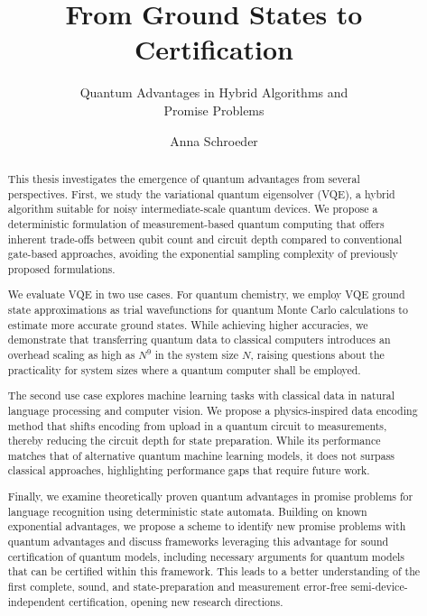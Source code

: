 \documentclass[
	english,%
	accentcolor=9c,%
	ruledheaders=chapter,%
	class=book,%
	thesis={%
		type=drfinal,
		dr=rernat
	},
	fontsize=11pt,%
	parskip=half-,%
	custommargins=true,%
	marginpar=false,%
]{tudapub}
\title{From Ground States to Certification}
\subtitle{ Quantum Advantages in Hybrid Algorithms and \\ Promise Problems}
\author{Anna Schroeder}
\begin{document}
\frontmatter
\maketitle



\affidavit%
\begin{abstract}
This thesis investigates the emergence of quantum advantages from several perspectives. First, we study the variational quantum eigensolver (VQE), a hybrid algorithm suitable for noisy intermediate-scale quantum devices. We propose a deterministic formulation of measurement-based quantum computing that offers inherent trade-offs between qubit count and circuit depth compared to conventional gate-based approaches, avoiding the exponential sampling complexity of previously proposed formulations.

We evaluate VQE in two use cases. For quantum chemistry, we employ VQE ground state approximations as trial wavefunctions for quantum Monte Carlo calculations to estimate more accurate ground states. While achieving higher accuracies, we demonstrate that transferring quantum data to classical computers introduces an overhead scaling as high as $N^9$ in the system size $N$, raising questions about the practicality for system sizes where a quantum computer shall be employed.

The second use case explores machine learning tasks with classical data in natural language processing and computer vision. We propose a physics-inspired data encoding method that shifts encoding from upload in a quantum circuit to measurements, thereby reducing the circuit depth for state preparation. While its performance matches that of alternative quantum machine learning models, it does not surpass classical approaches, highlighting performance gaps that require future work.

Finally, we examine theoretically proven quantum advantages in promise problems for language recognition using deterministic state automata. Building on known exponential advantages, we propose a scheme to identify new promise problems with quantum advantages and discuss frameworks leveraging this advantage for sound certification of quantum models, including necessary arguments for quantum models that can be certified within this framework. This leads to a better understanding of the first complete, sound, and state-preparation and measurement error-free semi-device-independent certification, opening new research directions.

\end{abstract}
\end{document}
